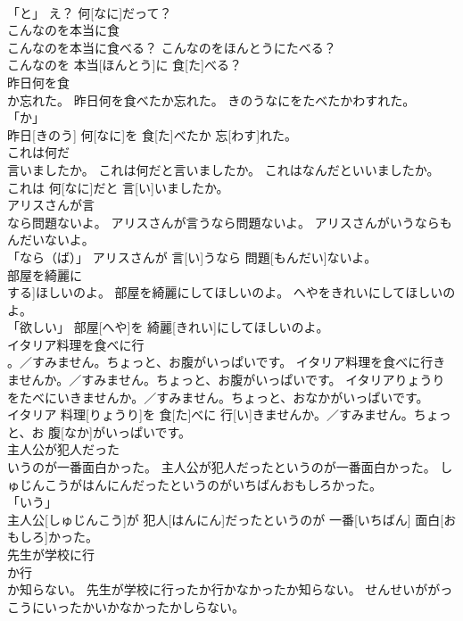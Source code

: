 \documentclass[8pt]{extreport}
\begin{document}
\begin{CJK}{UTF8}{min}
\\	「と」	え？ 何[なに]だって？		
\\	こんなのを本当に食
\\	こんなのを本当に食べる？	こんなのをほんとうにたべる？	
\\	こんなのを 本当[ほんとう]に 食[た]べる？		
\\	昨日何を食
\\	か忘れた。	昨日何を食べたか忘れた。	きのうなにをたべたかわすれた。	
\\	「か」 
\\	昨日[きのう] 何[なに]を 食[た]べたか 忘[わす]れた。		
\\	これは何だ
\\	言いましたか。	これは何だと言いましたか。	これはなんだといいましたか。	
\\	これは 何[なに]だと 言[い]いましたか。		
\\	アリスさんが言
\\	なら問題ないよ。	アリスさんが言うなら問題ないよ。	アリスさんがいうならもんだいないよ。	
\\	「なら（ば）」	アリスさんが 言[い]うなら 問題[もんだい]ないよ。		
\\	部屋を綺麗に
\\	する]ほしいのよ。	部屋を綺麗にしてほしいのよ。	へやをきれいにしてほしいのよ。	
\\	「欲しい」	部屋[へや]を 綺麗[きれい]にしてほしいのよ。		
\\	イタリア料理を食べに行
\\	。／すみません。ちょっと、お腹がいっぱいです。	イタリア料理を食べに行きませんか。／すみません。ちょっと、お腹がいっぱいです。	イタリアりょうりをたべにいきませんか。／すみません。ちょっと、おなかがいっぱいです。	
\\	イタリア 料理[りょうり]を 食[た]べに 行[い]きませんか。／すみません。ちょっと、お 腹[なか]がいっぱいです。		
\\	主人公が犯人だった
\\	いうのが一番面白かった。	主人公が犯人だったというのが一番面白かった。	しゅじんこうがはんにんだったというのがいちばんおもしろかった。	
\\	「いう」 
\\	主人公[しゅじんこう]が 犯人[はんにん]だったというのが 一番[いちばん] 面白[おもしろ]かった。		
\\	先生が学校に行
\\	か行
\\	か知らない。	先生が学校に行ったか行かなかったか知らない。	せんせいががっこうにいったかいかなかったかしらない。	

\end{CJK}
\end{document}

